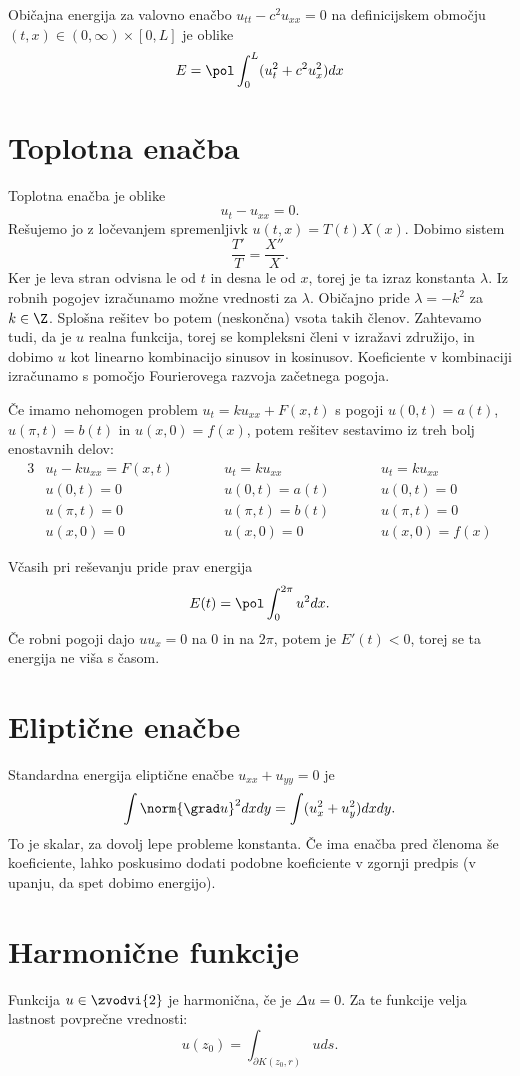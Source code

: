 Običajna energija za valovno enačbo $u_{tt} - c^2 u_{xx} = 0$
na definicijskem območju $(t,x) \in (0, \infty) \times [0, L]$ je oblike
\[
  E = \pol \int_0^L (u_t^2 + c^2 u_x^2) dx
\]

\section{Toplotna enačba}

Toplotna enačba je oblike
\[
  u_t - u_{xx} = 0.
\]
Rešujemo jo z ločevanjem spremenljivk $u(t,x) = T(t) X(x)$.
Dobimo sistem
\[
  \frac{T'}{T} = \frac{X''}{X}.
\]
Ker je leva stran odvisna le od $t$ in desna le od $x$, torej je ta izraz
konstanta $\lambda$.
Iz robnih pogojev izračunamo možne vrednosti za $\lambda$.
Običajno pride $\lambda = -k^2$ za $k \in \Z$.
Splošna rešitev bo potem (neskončna) vsota takih členov.
Zahtevamo tudi, da je $u$ realna funkcija, torej se kompleksni členi v izražavi
združijo, in dobimo $u$ kot linearno kombinacijo sinusov in kosinusov.
Koeficiente v kombinaciji izračunamo s pomočjo Fourierovega razvoja začetnega
pogoja.

Če imamo nehomogen problem $u_t = k u_{xx} + F(x,t)$ s pogoji $u(0,t) = a(t)$,
$u(\pi, t) = b(t)$ in $u(x,0) = f(x)$, potem rešitev sestavimo iz treh bolj
enostavnih delov:
\begin{alignat*}{3}
  & u_t - k u_{xx} = F(x,t) & \qquad & u_t = k u_{xx} & \qquad & u_t = k u_{xx} \\
  & u(0,t) = 0 & & u(0,t) = a(t) & & u(0,t) = 0 \\
  & u(\pi,t) = 0 & & u(\pi, t) = b(t) & & u(\pi, t) = 0 \\
  & u(x,0) = 0 & & u(x,0) = 0 & & u(x,0) = f(x)
\end{alignat*}

Včasih pri reševanju pride prav energija
\[
  E(t) = \pol \int_0^{2 \pi} u^2 dx.
\]
Če robni pogoji dajo $u u_x = 0$ na $0$ in na $2 \pi$, potem je $E'(t) < 0$,
torej se ta energija ne viša s časom.

\section{Eliptične enačbe}

Standardna energija eliptične enačbe $u_{xx} + u_{yy} = 0$ je
\[
  \int \norm{\grad u}^2 dx dy
  = \int (u_x^2 + u_y^2) dx dy.
\]
To je skalar, za dovolj lepe probleme konstanta.
Če ima enačba pred členoma še koeficiente, lahko poskusimo dodati podobne
koeficiente v zgornji predpis (v upanju, da spet dobimo energijo).

\section{Harmonične funkcije}

Funkcija $u \in \zvodvi{2}$ je harmonična, če je $\Delta u = 0$.
Za te funkcije velja lastnost povprečne vrednosti:
\[
  u(z_0) = \int_{\partial K(z_0, r)} u ds.
\]

